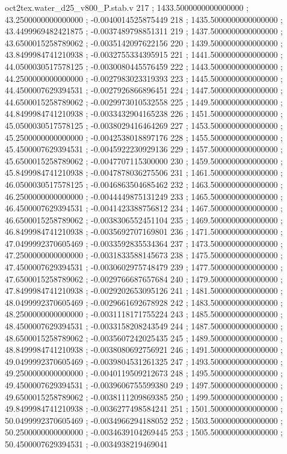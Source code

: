\begin{filecontents}[overwrite]{oct2tex.water_d25_v800_P.stab.v}
217 ; 1433.5000000000000000 ; 43.2500000000000000 ; -0.0040014525875449
218 ; 1435.5000000000000000 ; 43.4499969482421875 ; -0.0037489798851311
219 ; 1437.5000000000000000 ; 43.6500015258789062 ; -0.0035142097622156
220 ; 1439.5000000000000000 ; 43.8499984741210938 ; -0.0032755334395915
221 ; 1441.5000000000000000 ; 44.0500030517578125 ; -0.0030080445576459
222 ; 1443.5000000000000000 ; 44.2500000000000000 ; -0.0027983023319393
223 ; 1445.5000000000000000 ; 44.4500007629394531 ; -0.0027926866896451
224 ; 1447.5000000000000000 ; 44.6500015258789062 ; -0.0029973010532558
225 ; 1449.5000000000000000 ; 44.8499984741210938 ; -0.0033432904165238
226 ; 1451.5000000000000000 ; 45.0500030517578125 ; -0.0038029416464269
227 ; 1453.5000000000000000 ; 45.2500000000000000 ; -0.0042538018897176
228 ; 1455.5000000000000000 ; 45.4500007629394531 ; -0.0045922230929136
229 ; 1457.5000000000000000 ; 45.6500015258789062 ; -0.0047707115300000
230 ; 1459.5000000000000000 ; 45.8499984741210938 ; -0.0047878036275506
231 ; 1461.5000000000000000 ; 46.0500030517578125 ; -0.0046863504685462
232 ; 1463.5000000000000000 ; 46.2500000000000000 ; -0.0044449875131249
233 ; 1465.5000000000000000 ; 46.4500007629394531 ; -0.0041423388756812
234 ; 1467.5000000000000000 ; 46.6500015258789062 ; -0.0038306552451104
235 ; 1469.5000000000000000 ; 46.8499984741210938 ; -0.0035692707169801
236 ; 1471.5000000000000000 ; 47.0499992370605469 ; -0.0033592835534364
237 ; 1473.5000000000000000 ; 47.2500000000000000 ; -0.0031833588145673
238 ; 1475.5000000000000000 ; 47.4500007629394531 ; -0.0030602975748479
239 ; 1477.5000000000000000 ; 47.6500015258789062 ; -0.0029766687657684
240 ; 1479.5000000000000000 ; 47.8499984741210938 ; -0.0029202653095126
241 ; 1481.5000000000000000 ; 48.0499992370605469 ; -0.0029661692678928
242 ; 1483.5000000000000000 ; 48.2500000000000000 ; -0.0031118171755224
243 ; 1485.5000000000000000 ; 48.4500007629394531 ; -0.0033158208243549
244 ; 1487.5000000000000000 ; 48.6500015258789062 ; -0.0035607242025435
245 ; 1489.5000000000000000 ; 48.8499984741210938 ; -0.0038080692756921
246 ; 1491.5000000000000000 ; 49.0499992370605469 ; -0.0039804531261325
247 ; 1493.5000000000000000 ; 49.2500000000000000 ; -0.0040119509212673
248 ; 1495.5000000000000000 ; 49.4500007629394531 ; -0.0039606755599380
249 ; 1497.5000000000000000 ; 49.6500015258789062 ; -0.0038111209869385
250 ; 1499.5000000000000000 ; 49.8499984741210938 ; -0.0036277498584241
251 ; 1501.5000000000000000 ; 50.0499992370605469 ; -0.0034966294188052
252 ; 1503.5000000000000000 ; 50.2500000000000000 ; -0.0034639104269445
253 ; 1505.5000000000000000 ; 50.4500007629394531 ; -0.0034938219469041

\end{filecontents}
